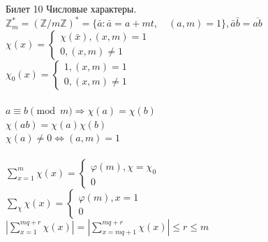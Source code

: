 \documentclass[a4paper,12pt]{article}
\newcommand{\ee}{\equiv}
\newcommand{\FI}{\varphi}
\newcommand{\q}{\quad}
\newcommand{\Ra}{\Rightarrow}
\newcommand{\bb}[1]{\mathbb{#1}}
\newcommand{\SL}{\sum\limits}
\newcommand{\os}{\left(}
\newcommand{\cs}{\right)}
\begin{document}
\begin{mybox}{\hypertarget{bil10}{Билет 10}}
Числовые характеры.\\
$\bb{Z}_m^* = \os \bb{Z}/m\bb{Z}  \cs^* = \{\bar{a}: \bar{a} = a + mt,\q (a,m) = 1 \}, \bar{a}\bar{b} = \overline{ab}  $\\
$\chi(x) = \begin{cases} \chi(\bar{x}), (x,m)=1\\0,(x,m) \not=1 \end{cases} $\\
$\chi_0(x) = \begin{cases} 1, (x,m)=1\\0,(x,m) \not=1 \end{cases} $\\\q\\
$a\ee b \pmod{m} \Ra \chi(a) = \chi(b) $\\
$\chi(ab) = \chi(a)\chi(b) $\\
$\chi(a)\not=0 \iff (a,m)=1$\\\q\\
$\SL_{x=1}^m \chi(x) = \begin{cases} \FI(m), \chi = \chi_0\\0 \end{cases} $\\
$\SL_{\chi} \chi(x) = \begin{cases} \FI(m), x = 1\\0 \end{cases} $\\
$|\SL_{x=1}^{mq+r} \chi(x) | = |\SL_{x=mq+1}^{mq+r} \chi(x)|\le r\le m$
\end{mybox}
\end{document}
